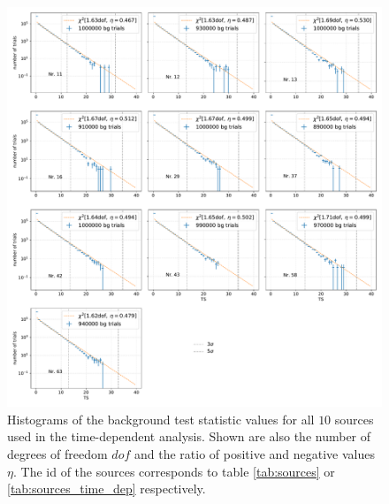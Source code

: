 \begin{figure}
    \centering
    \includegraphics[width=\linewidth-2cm]{Plots/05_csky/9_years_gfu_gold_time_dep_bg_t0.pdf}
    \caption{Histograms of the background test statistic values for all $\num{10}$ sources used in the time-dependent analysis. Shown are also the number of degrees of freedom $dof$ and the ratio of positive and negative values $\eta$. The id of the sources corresponds to table \ref{tab:sources} or \ref{tab:sources_time_dep} respectively.}
    \label{fig:bg_trials_time_dep}
\end{figure}

